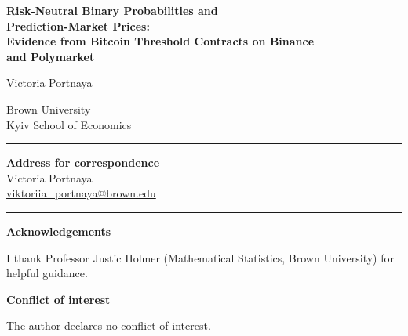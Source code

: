 \documentclass[11pt]{article}
\begin{document}
\thispagestyle{empty}
\vspace*{2em}

\begin{center}
{\LARGE\bfseries Risk-Neutral Binary Probabilities and\\[0.35em]
Prediction-Market Prices:\\[0.5em]
Evidence from Bitcoin Threshold Contracts on Binance\\[0.25em]
and Polymarket\par}

\vspace{2.5em}

{\large Victoria Portnaya\par}

\vspace{1.25em}

{\normalsize
Brown University\\
Kyiv School of Economics\par}

\vspace{2.5em}

\rule{0.55\textwidth}{0.4pt}

\vspace{1.25em}

\textbf{Address for correspondence}\\[0.5em]
Victoria Portnaya\\
\href{mailto:viktoriia_portnaya@brown.edu}{viktoriia\_portnaya@brown.edu}

\vspace{2.5em}

\rule{0.55\textwidth}{0.4pt}

\vspace{1.25em}

\textbf{Acknowledgements}\\[0.65em]
\begin{minipage}{0.88\textwidth}
\small
I thank Professor Justic Holmer (Mathematical Statistics, Brown University) for helpful guidance.
\end{minipage}

\vspace{1.75em}

\textbf{Conflict of interest}\\[0.65em]
\begin{minipage}{0.88\textwidth}
\small
The author declares no conflict of interest.
\end{minipage}

\end{center}

\vfill
\end{document}
